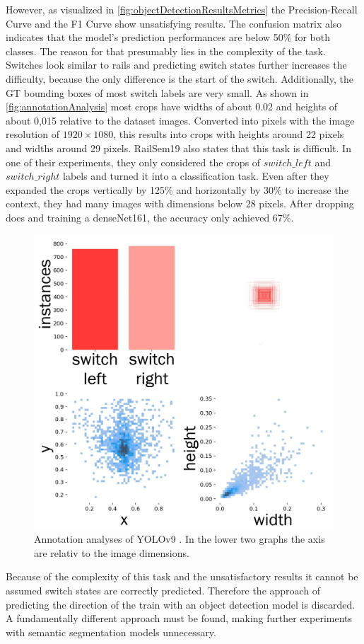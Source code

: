 However, as visualized in \autoref{fig:objectDetectionResultsMetrics} the Precision-Recall Curve and the F1 Curve show unsatisfying results.
The confusion matrix also indicates that the model's prediction performances are below 50\% for both classes.
The reason for that presumably lies in the complexity of the task.
Switches look similar to rails and predicting switch states further increases the difficulty, because the only difference is the start of the switch.
Additionally, the \ac{GT} bounding boxes of most switch labels are very small.
As shown in \autoref{fig:annotationAnalysis} most crops have widths of about 0.02 and heights of about 0,015 relative to the dataset images.
Converted into pixels with the image resolution of $1920 \times 1080$, this results into crops with heights around 22 pixels and widths around 29 pixels.
RailSem19 \cite{railsem19dataset} also states that this task is difficult.
In one of their experiments, they only considered the crops of $switch\_left$ and $switch\_right$ labels and turned it into a classification task.
Even after they expanded the crops vertically by 125\% and horizontally by 30\% to increase the context, they had many images with dimensions below 28 pixels.
After dropping does and training a denseNet161, the accuracy only achieved 67\%.

\begin{figure}[H]
    \centering
    \includegraphics[width=0.6\linewidth]{PICs/experiments/objectdetectionExperiment/labels_updated.jpg}
    \caption{Annotation analyses of \ac{YOLO}v9 \cite{YOLOv9GitHub}. In the lower two graphs the axis are relativ to the image dimensions.}
    \label{fig:annotationAnalysis}
\end{figure}

Because of the complexity of this task and the unsatisfactory results it cannot be assumed switch states are correctly predicted.
Therefore the approach of predicting the direction of the train with an object detection model is discarded.
A fundamentally different approach must be found, making further experiments with semantic segmentation models unnecessary.